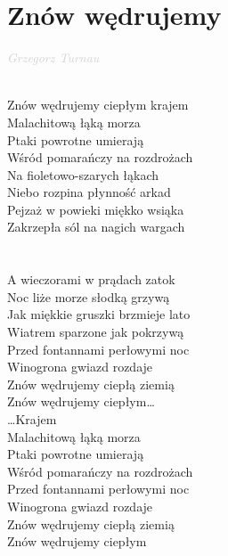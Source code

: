 \documentclass[a5paper, 10pt]{book}
\begin{document}
\section{Znów wędrujemy}\textcolor{lightgray}{\textit{Grzegorz Turnau}}\\~\\
\begin{minipage}[t]{0.8\textwidth}
Znów wędrujemy ciepłym krajem\\
Malachitową łąką morza\\
Ptaki powrotne umierają\\
Wśród pomarańczy na rozdrożach\\
\hspace*{4mm}Na fioletowo-szarych łąkach\\
\hspace*{4mm}Niebo rozpina płynność arkad\\
\hspace*{4mm}Pejzaż w powieki miękko wsiąka\\
\hspace*{4mm}Zakrzepła sól na nagich wargach\\
\\
\\
A wieczorami w prądach zatok\\
Noc liże morze słodką grzywą\\
Jak miękkie gruszki brzmieje lato\\
Wiatrem sparzone jak pokrzywą\\
\hspace*{4mm}Przed fontannami perłowymi noc\\
\hspace*{4mm}Winogrona gwiazd rozdaje\\
\hspace*{4mm}Znów wędrujemy ciepłą ziemią\\
\hspace*{4mm}Znów wędrujemy ciepłym\ldots \\

\ldots Krajem\\
Malachitową łąką morza\\
Ptaki powrotne umierają\\
Wśród pomarańczy na rozdrożach\\
\hspace*{4mm}Przed fontannami perłowymi noc\\
\hspace*{4mm}Winogrona gwiazd rozdaje\\
\hspace*{4mm}Znów wędrujemy ciepłą ziemią\\
\hspace*{4mm}Znów wędrujemy ciepłym\\
\end{minipage}
\end{document}
